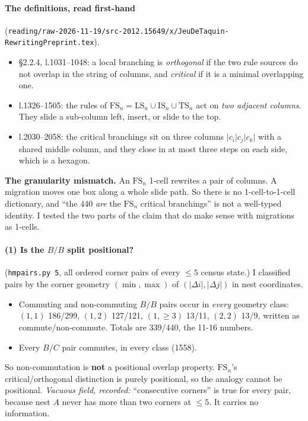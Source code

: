 \documentclass[11pt]{article}
\theoremstyle{definition}\newtheorem{definition}[theorem]{Definition}\newtheorem{remark}[theorem]{Remark}
\begin{document}
\paragraph{The definitions, read first-hand} (\texttt{reading/raw-2026-11-19/src-2012.15649/x/JeuDeTaquin-RewritingPreprint.tex}).
\begin{itemize}
\item \S2.2.4, l.1031--1048: a local branching is \emph{orthogonal} if the two rule sources do not overlap in the string of columns, and \emph{critical} if it is a minimal overlapping one.
\item l.1326--1505: the rules of $\mathrm{FS}_n=\mathrm{LS}_n\cup\mathrm{IS}_n\cup\mathrm{TS}_n$ act on \emph{two adjacent columns}. They slide a sub-column left, insert, or slide to the top.
\item l.2030--2058: the critical branchings sit on three columns $|c_i|c_j|c_k|$ with a shared middle column, and they close in at most three steps on each side, which is a hexagon.
\end{itemize}
\textbf{The granularity mismatch.} An $\mathrm{FS}_n$ 1-cell rewrites a pair of columns. A migration moves one box along a whole slide path. So there is no 1-cell-to-1-cell dictionary, and ``the 440 \emph{are} the $\mathrm{FS}_n$ critical branchings'' is not a well-typed identity. I tested the two parts of the claim that do make sense with migrations as 1-cells.

\paragraph{(1) Is the $B/B$ split positional?} (\texttt{hmpairs.py 5}, all ordered corner pairs of every $\le5$ census state.)
I classified pairs by the corner geometry $(\min,\max)$ of $(|\Delta i|,|\Delta j|)$ in nest coordinates.
\begin{itemize}
\item Commuting and non-commuting $B/B$ pairs occur in \emph{every} geometry class: $(1,1)$ 186/299, $(1,2)$ 127/121, $(1,\ge3)$ 13/11, $(2,2)$ 13/9, written as commute/non-commute. Totals are 339/440, the 11-16 numbers.
\item Every $B/C$ pair commutes, in every class (1558).
\end{itemize}
So non-commutation is \textbf{not} a positional overlap property. $\mathrm{FS}_n$'s critical/orthogonal distinction is purely positional, so the analogy cannot be positional.
\emph{Vacuous field, recorded:} ``consecutive corners'' is true for every pair, because nest $A$ never has more than two corners at $\le5$. It carries no information.
\end{document}
